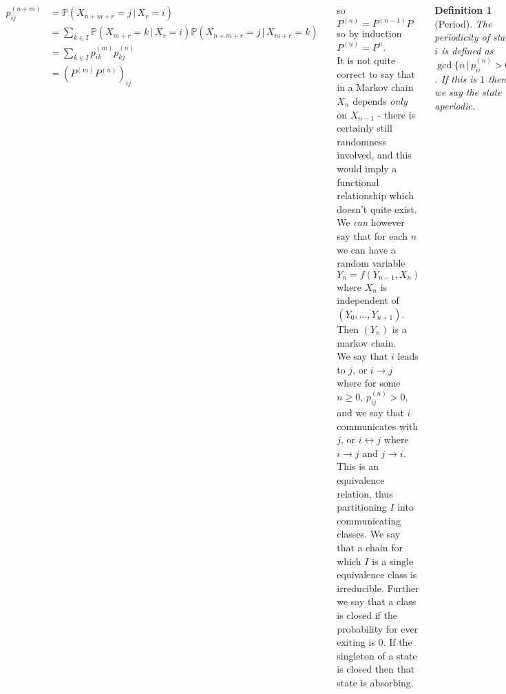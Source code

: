\documentclass{tikzposter} %
\newtheorem{definition}{Definition}
\begin{document}
\begin{columns}
{  \begin{align*}
    p_{ij}^{(n+m)} &= \mathbb{P}(X_{n+m+r} = j \,|\, X_{r} = i) \\
                  &= \sum_{k \in I} \mathbb{P}(X_{m+r} = k \,|\, X_{r} = i) \mathbb{P}(X_{n+m+r} = j \,|\, X_{m+r} = k) \\
                  &= \sum_{k \in I} p^{(m)}_{ik} p^{(n)}_{kj} \\
    &= (P^{(m)}P^{(n)})_{ij}
  \end{align*}

  so $P^{(n)} = P^{(n-1)}P$ so by induction $P^{(n)} = P^{n}$. \\

  It is not quite correct to say that in a Markov chain $X_{n}$ depends \emph{only} on $X_{n-1}$ - there is certainly still randomness involved, and this would imply a functional relationship which doesn't quite exist. We \emph{can} however say that for each $n$ we can have a random variable $Y_{n} = f(Y_{n-1}, X_{n})$ where $X_{n}$ is independent of $(Y_{0},\dots, Y_{n+1})$. Then $(Y_{n})$ is a markov chain. \\

  We say that $i$ leads to $j$, or $i \to j$ where for some $n \ge 0$, $p^{(n)}_{ij} > 0$, and we say that $i$ communicates with $j$, or $i \leftrightarrow j$ where $i \to j$ and $j \to i$. This is an equivalence relation, thus partitioning $I$ into communicating classes. We say that a chain for which $I$ is a single equivalence class is irreducible. Further we say that a class is closed if the probability for ever exiting is $0$. If the singleton of a state is closed then that state is absorbing. \\

  \begin{definition}[Period]
    The periodicity of state $i$ is defined as $\gcd \{ n \,|\, p^{(n)}_{ii} > 0\}$. If this is $1$ then we say the state is aperiodic.
  \end{definition}
  \hphantom{}

  All states within the same communicating class have the same period. To see this note that if $i$ and $j$ communicate, then we can get $a$, $b$ such that $p^{(a)}_{ij} > 0$ and $p^{(b)}_{ji} > 0$, so $p^{(a+b)}_{ii} > 0$. Further, if $p^{(m)}_{jj} > 0$, then $p^{(a+b+m)}_{ii} > 0$. Thus if $i$ has period $d$, then $d \,|\, a+b+m$ and $d \,|\, a+b$, so $d \,|\, m$. Thus the period of $i$ divides the period of $j$, and by symmetry thus the reverse holds, so the period of $i$ is equal to the period of $j$. \\

}
\end{columns}
\end{document}
